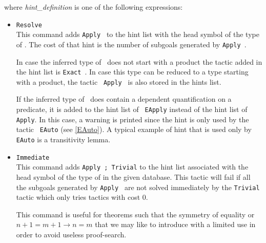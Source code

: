 \noindent where {\sl hint\_definition} is one of the following expressions:

\begin{itemize}
\item \texttt{Resolve} {\term} \\
  This command adds {\tt Apply {\term}} to the hint list
  with the head symbol of the type of \term. The cost of that hint is
  the number of subgoals generated by {\tt Apply {\term}}.
  
  In case the inferred type of \term\ does not start with a product the
  tactic added in the hint list is {\tt Exact {\term}}. In case this
  type can be reduced to a type starting with a product, the tactic {\tt
    Apply {\term}} is also stored in the hints list.
  
  If the inferred type of \term\ does contain a dependent
  quantification on a predicate, it is added to the hint list of {\tt
    EApply} instead of the hint list of {\tt Apply}. In this case, a
  warning is printed since the hint is only used by the tactic {\tt
    EAuto} (see \ref{EAuto}). A typical example of hint that is used
  only by \texttt{EAuto} is a transitivity lemma.


\item \texttt{Immediate {\term}} \\
  
  This command adds {\tt Apply {\term}; Trivial} to the hint list
  associated with the head symbol of the type of \ident in the given
  database. This tactic will fail if all the subgoals generated by
  {\tt Apply {\term}} are 
  not solved immediately by the {\tt Trivial} tactic which only tries
  tactics with cost $0$.
  
  This command is useful for theorems such that the symmetry of equality
  or $n+1=m+1 \to n=m$ that we may like to introduce with a
  limited use in order to avoid useless proof-search.
  

\end{itemize}
